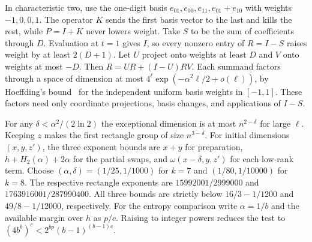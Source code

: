 \documentclass[11pt,letterpaper]{article}
\begin{document}
In characteristic two, use the one-digit basis \(e_{01},e_{00},e_{11},e_{01}+e_{10}\) with weights \(-1,0,0,1\). The operator \(K\) sends the first basis vector to the last and kills the rest, while \(P=I+K\) never lowers weight. Take \(S\) to be the sum of coefficients through \(D\). Evaluation at \(t=1\) gives \(I\), so every nonzero entry of \(R=I-S\) raises weight by at least \(2(D+1)\). Let \(U\) project onto weights at least \(D\) and \(V\) onto weights at most \(-D\). Then \(R=UR+(I-U)RV\). Each summand factors through a space of dimension at most \(4^\ell\exp(-\alpha^2\ell/2+o(\ell))\), by Hoeffding's bound~\cite[Theorem~2]{hoeffding} for the independent uniform basis weights in \([-1,1]\). These factors need only coordinate projections, basis changes, and applications of \(I-S\).

For any \(\delta<\alpha^2/(2\ln2)\) the exceptional dimension is at most \(n^{2-\delta}\) for large \(\ell\). Keeping \(z\) makes the first rectangle group of size \(n^{3-\delta}\). For initial dimensions \((x,y,z')\), the three exponent bounds are \(x+y\) for preparation, \(h+H_2(\alpha)+2\alpha\) for the partial swaps, and \(\omega(x-\delta,y,z')\) for each low-rank term. Choose \((\alpha,\delta)=(1/25,1/1000)\) for \(k=7\) and \((1/80,1/10000)\) for \(k=8\). The respective rectangle exponents are \(15992001/2999000\) and \(1763916001/287990400\). All three bounds are strictly below \(16/3-1/1200\) and \(49/8-1/12000\), respectively. For the entropy comparison write \(\alpha=1/b\) and the available margin over \(h\) as \(p/c\). Raising to integer powers reduces the test to \((4b^b)^c<2^{bp}(b-1)^{(b-1)c}\).
\clearpage
{}


\end{document}
